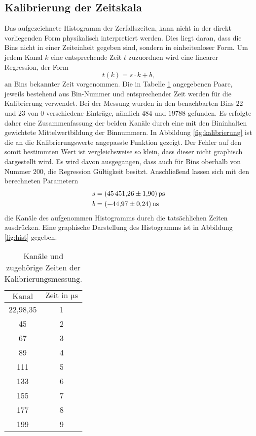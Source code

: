 \FloatBarrier
\subsection{Kalibrierung der Zeitskala}
\label{subsec:a1}
Das aufgezeichnete Histogramm der Zerfallszeiten, kann nicht in
der direkt vorliegenden Form physikalisch interpretiert werden.
Dies liegt daran, dass die Bins nicht in einer Zeiteinheit gegeben sind, sondern
in einheitenloser Form. Um jedem Kanal $k$ eine entsprechende Zeit $t$
zuzuordnen wird eine linearer Regression, der Form
\begin{equation}
  t(k) = s \cdot k + b ,
\end{equation}
an Bins bekannter Zeit vorgenommen.
Die in Tabelle \ref{tab:kalibrier_werte} angegebenen Paare, jeweils bestehend
aus Bin-Nummer und entsprechender Zeit werden für die Kalibrierung verwendet.
Bei der Messung wurden in den benachbarten Bins $22$ und $23$ von $0$ verschiedene
Einträge, nämlich $484$ und $19788$ gefunden. Es erfolgte daher eine Zusammenfassung der beiden Kanäle durch
eine mit den Bininhalten gewichtete Mittelwertbildung der Binnummern.
In Abbildung \ref{fig:kalibrierung} ist die an die Kalibrierungswerte angepasste Funktion
gezeigt. Der Fehler auf den
somit bestimmten Wert ist vergleichsweise so klein, dass dieser nicht graphisch dargestellt wird.
Es wird davon ausgegangen, dass auch für Bins oberhalb von Nummer $200$,
die Regression Gültigkeit besitzt.
Anschließend lassen sich mit den berechneten Parametern
\begin{align}
  s &= \SI{45451.26+-1.90}{\pico\second}\\
  b &= \SI{-44.97+-0.24}{\nano\second}
\end{align}
die Kanäle des aufgenommen Histogramms durch die tatsächlichen Zeiten ausdrücken.
Eine graphische Darstellung des Histogramms ist in Abbildung \ref{fig:hist} gegeben.

\begin{table}
  \centering
  \caption{Kanäle und zugehörige Zeiten der Kalibrierungsmessung.}
  \label{tab:kalibrier_werte}
  \begin{tabular}{c c}
    \toprule
    $ \text{Kanal}$ & $ \text{Zeit \ in } \si{\micro\second} $\\
    \midrule
     22,98\pm0,35 & 1 \\
     45 & 2\\
     67 & 3\\
     89 & 4\\
    111 & 5\\
    133 & 6\\
    155 & 7\\
    177 & 8\\
    199 & 9\\
   \bottomrule
  \end{tabular}
\end{table}

